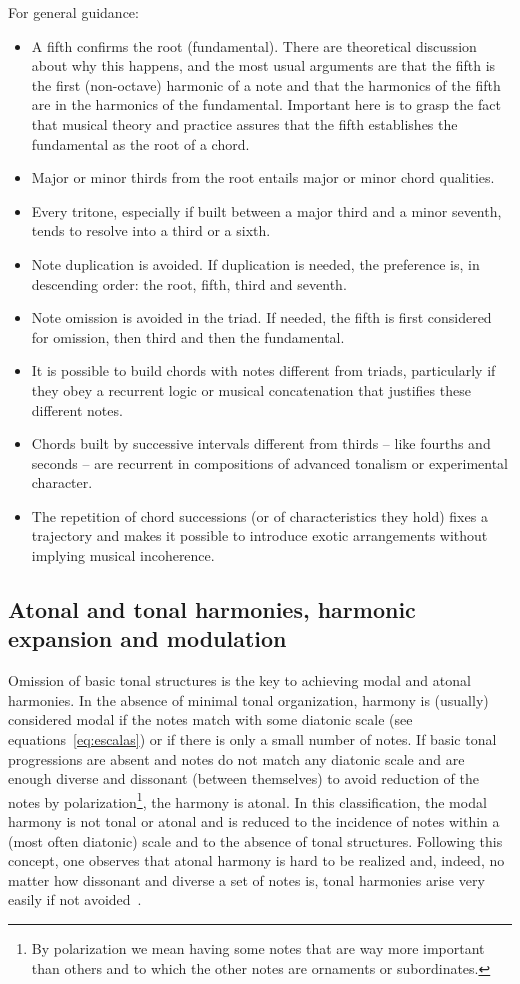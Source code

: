 For general guidance:
\begin{itemize}
        \item A fifth confirms the root (fundamental).
		There are theoretical discussion about why this happens, and the most usual arguments are that the fifth is the first (non-octave) harmonic of a note and that the harmonics of the fifth are in the harmonics of the fundamental.
		Important here is to grasp the fact that musical theory and practice assures that the fifth establishes the fundamental as the root of a chord.
        \item Major or minor thirds from the root entails major or minor chord qualities.
        \item Every tritone, especially if built between a major third and a minor seventh, tends to resolve into a third or a sixth.
        \item Note duplication is avoided. If duplication is needed, the preference is, in descending order: the root, fifth, third and seventh.
        \item Note omission is avoided in the triad. If needed, the fifth is first considered for omission, then third and then the fundamental.
        \item It is possible to build chords with notes different from triads, particularly if they obey a recurrent logic or musical concatenation that justifies these different notes.
        \item Chords built by successive intervals different from thirds – like fourths and seconds -- are recurrent in compositions of advanced tonalism or experimental character.
        \item The repetition of chord successions (or of characteristics they hold) fixes a trajectory and makes it possible to 
introduce exotic arrangements without implying musical incoherence.
\end{itemize}

\subsection{Atonal and tonal harmonies, harmonic expansion and modulation}\label{subsec:harmonia}
Omission of basic tonal structures is the key to achieving modal and atonal harmonies. In the absence of minimal tonal organization,
harmony is (usually) considered modal if the notes match with some diatonic scale (see equations~\ref{eq:escalas}) or if there is only a small number of notes. If basic tonal progressions are absent and notes do not match any diatonic scale and are enough diverse and dissonant (between themselves) to avoid reduction of the notes by polarization\footnote{By polarization we mean having some notes that are way more important than others and to which the other notes are ornaments or subordinates.}, the harmony is atonal. In this classification, the modal harmony is not tonal or atonal and is reduced to the incidence of notes within a (most often diatonic) scale and to the absence of tonal structures. Following this concept, one observes that atonal harmony is hard to be realized and, indeed, no matter how dissonant and diverse
a set of notes is, tonal harmonies arise very easily if not avoided~\cite{harmEXT}.

